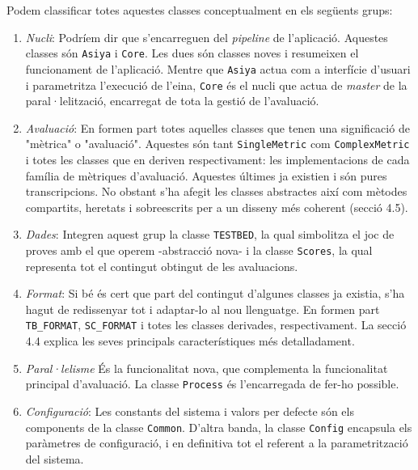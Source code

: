\documentclass[11pt,a4paper]{article}
\begin{document}
Podem classificar totes aquestes classes conceptualment en els següents grups:
\begin{enumerate}
\item \textit{Nucli}: Podríem dir que s'encarreguen del \textit{pipeline} de l'aplicació. Aquestes classes són  \texttt{Asiya} i \texttt{Core}. Les dues són classes noves i resumeixen el funcionament de l'aplicació. Mentre que \texttt{Asiya} actua com a interfície d'usuari i parametritza l'execució de l'eina, \texttt{Core} és el nucli que actua de \textit{master} de la paral·lelització, encarregat de tota la gestió de l'avaluació.

\item \textit{Avaluació}: En formen part totes aquelles classes que tenen una significació de "mètrica" o "avaluació". Aquestes són tant \texttt{SingleMetric} com \texttt{ComplexMetric} i totes les classes que en deriven respectivament: les implementacions de cada família de mètriques d'avaluació. Aquestes últimes ja existien i són pures transcripcions. No obstant s'ha afegit les classes abstractes així com mètodes compartits, heretats i sobreescrits per a un disseny més coherent (secció 4.5).

\item \textit{Dades}: Integren aquest grup la classe \texttt{TESTBED}, la qual simbolitza el joc de proves amb el que operem -abstracció nova- i la classe \texttt{Scores}, la qual representa tot el contingut obtingut de les avaluacions.

\item \textit{Format}: Si bé és cert que part del contingut d'algunes classes ja existia, s'ha hagut de redissenyar tot i adaptar-lo al nou llenguatge. En formen part \texttt{TB\_FORMAT}, \texttt{SC\_FORMAT} i totes les classes derivades, respectivament. La secció 4.4 explica les seves principals característiques més detalladament.

\item \textit{Paral·lelisme} És la funcionalitat nova, que complementa la funcionalitat principal d'avaluació. La classe \texttt{Process} és l'encarregada de fer-ho possible.

\item \textit{Configuració}: Les constants del sistema i valors per defecte són els components de la classe \texttt{Common}. D'altra banda, la classe \texttt{Config} encapsula els paràmetres de configuració, i en definitiva tot el referent a la parametrització del sistema.
\end{enumerate}
\end{document}
